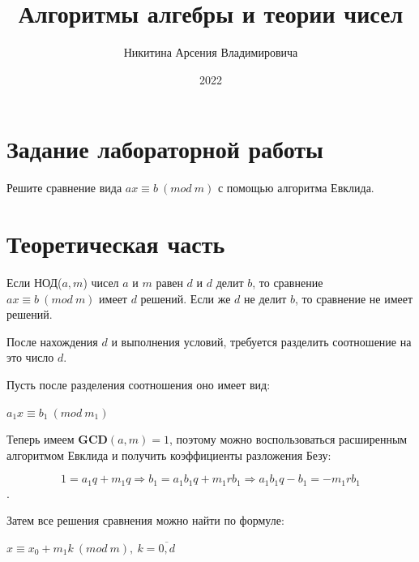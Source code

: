 \documentclass[bachelor, och, labwork]{shiza}
\begin{document}
\title{Алгоритмы алгебры и теории чисел}





\author{Никитина Арсения Владимировича}




\date{2022}

\maketitle



\tableofcontents

\section{Задание лабораторной работы}

Решите сравнение вида $ax \equiv b ~(mod ~m)$ с помощью алгоритма Евклида.

\section{Теоретическая часть}

Если НОД($a, m$) чисел $a$ и $m$ равен $d$ и $d$ делит
$b$, то сравнение $ax \equiv b ~(mod ~m)$ имеет $d$ решений. Если же $d$ не делит 
$b$, то сравнение не имеет решений.

После нахождения $d$ и выполнения условий, требуется разделить соотношение на
это число $d$.

Пусть после разделения соотношения оно имеет вид:

\begin{center}
    $a_1x \equiv b_1 ~(mod ~ m_1)$
\end{center}

Теперь имеем $\mathbf{GCD} (a,m) = 1$, поэтому можно воспользоваться расширенным
алгоритмом Евклида и получить коэффициенты разложения Безу:

$$1 = a_1q + m_1q \Rightarrow b_1 = a_1b_1q + m_1rb_1 \Rightarrow a_1b_1q-b_1=-m_1rb_1$$.

Затем все решения сравнения можно найти по формуле:

\begin{center}
    $x \equiv x_0 + m_1k ~(mod ~m), ~k=\overline{0, d}$
\end{center}
\end{document}
